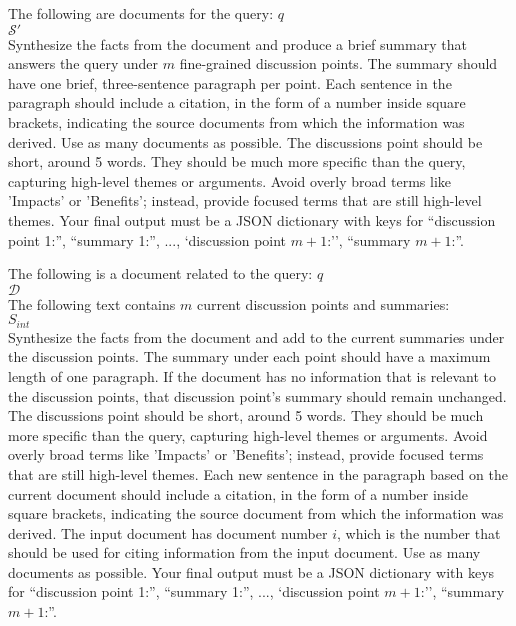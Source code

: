 \begin{prompt}[title={Prompt \thetcbcounter: Hierarchical Summarization Prompt (Merge Summaries) (\cref{subsection:summary})}, label=prompt:h2]
The following are documents for the query: $q$\\
$\mathcal{S}'$\\
Synthesize the facts from the document and produce a brief summary that answers the query under $m$ fine-grained discussion points. The summary should have one brief, three-sentence paragraph per point. Each sentence in the paragraph should include a citation, in the form of a number inside square brackets, indicating the source documents from which the information was derived. Use as many documents as possible. The discussions point should be short, around 5 words. They should be much more specific than the query, capturing high-level themes or arguments. Avoid overly broad terms like 'Impacts' or 'Benefits'; instead, provide focused terms that are still high-level themes. Your final output must be a JSON dictionary with keys for ``discussion point 1:'', ``summary 1:'', ..., `discussion point $m+1$:'', ``summary $m+1$:''.
\end{prompt}

\begin{prompt}[title={Prompt \thetcbcounter: Incremental Summarization Prompt (Merge Summaries) (\cref{subsection:summary})}, label=prompt:i1]
The following is a document related to the query: $q$\\
$\mathcal{D}$\\
The following text contains $m$ current discussion points and summaries:\\
$S_{int}$\\
Synthesize the facts from the document and add to the current summaries under the discussion points. The summary under each point should have a maximum length of one paragraph. If the document has no information that is relevant to the discussion points, that discussion point's summary should remain unchanged. The discussions point should be short, around 5 words. They should be much more specific than the query, capturing high-level themes or arguments. Avoid overly broad terms like 'Impacts' or 'Benefits'; instead, provide focused terms that are still high-level themes. Each new sentence in the paragraph based on the current document should include a citation, in the form of a number inside square brackets, indicating the source document from which the information was derived. The input document has document number $i$, which is the number that should be used for citing information from the input document. Use as many documents as possible. Your final output must be a JSON dictionary with keys for ``discussion point 1:'', ``summary 1:'', ..., `discussion point $m+1$:'', ``summary $m+1$:''.
\end{prompt}

